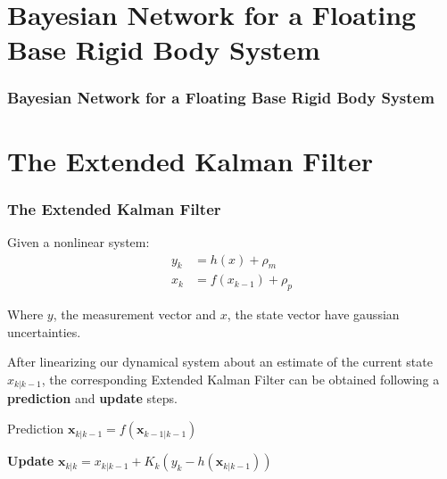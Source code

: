 \documentclass[xcolor=dvipsnames]{beamer}
\begin{document}
\section{Bayesian Network for a Floating Base Rigid Body System}
\begin{frame}
 \frametitle{Bayesian Network for a Floating Base Rigid Body System}
 
 \centering

\end{frame}


\section{The Extended Kalman Filter}
\begin{frame}
  \frametitle{The Extended Kalman Filter}
  Given a nonlinear system:
  \begin{align}
   y_k &= h(x) + \rho_m \\
   x_k &= f(x_{k-1}) + \rho_p
  \end{align}
  
  Where $y$, the measurement vector and $x$, the state vector have gaussian uncertainties.

  After linearizing our dynamical system about an estimate of the current state ${x}_{k|k-1}$, the corresponding Extended Kalman Filter can be obtained following a \textbf{prediction} and \textbf{update} steps.
  \begin{alertblock}{Prediction}
    $\mathbf{x}_{k|k-1} = f(\mathbf{x}_{k-1|k-1})$
  \end{alertblock}
  
  \begin{alertblock}{\textbf{Update}}
    $\mathbf{x}_{k|k} = x_{k|k-1} + K_k(y_k - h(\mathbf{x}_{k|k-1}))$
  \end{alertblock}
\end{frame}
\end{document}

